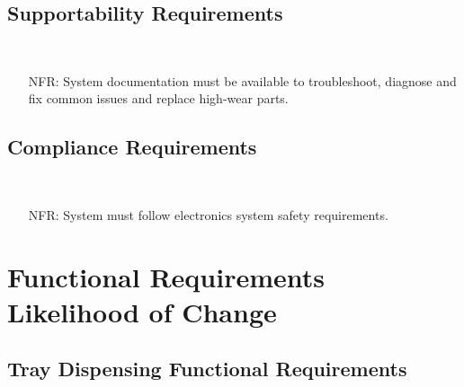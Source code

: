 \documentclass[12pt]{article}
\newcounter{nfrnum} %
\begin{document}
  \subsection{Supportability Requirements }\
  \noindent \begin{itemize}
  \item[NFR\refstepcounter{nfrnum}\thenfrnum \label{NFR_Supportability1}:]
  System documentation must be available to troubleshoot, diagnose and fix common issues and replace high-wear parts.
  \end{itemize}

  \subsection{Compliance Requirements }\
  \noindent \begin{itemize}
  \item[NFR\refstepcounter{nfrnum}\thenfrnum \label{NFR_Compliance1}:]
  System must follow electronics system safety requirements.
  \end{itemize}
  

\section{Functional Requirements Likelihood of Change}

\subsection{Tray Dispensing Functional Requirements}
\end{document}
